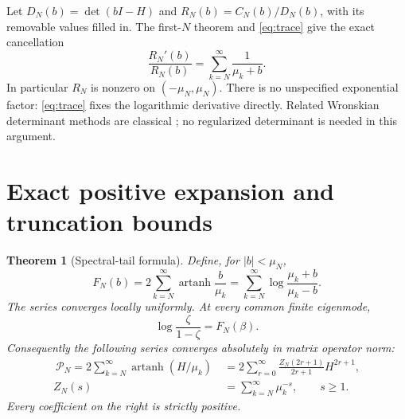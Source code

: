 \documentclass[10pt]{article}
\newtheorem{theorem}{Theorem}
\newcommand{\artanh}{\operatorname{artanh}}
\begin{document}
Let $D_N(b)=\det(bI-H)$ and $R_N(b)=C_N(b)/D_N(b)$, with its
removable values filled in. The first-$N$ theorem and \eqref{eq:trace}
give the exact cancellation
\begin{equation}
\frac{R_N'(b)}{R_N(b)}
=\sum_{k=N}^{\infty}\frac1{\mu_k+b}.
\label{eq:deftrace}
\end{equation}
In particular $R_N$ is nonzero on $(-\mu_N,\mu_N)$.
There is no unspecified exponential factor: \eqref{eq:trace} fixes
the logarithmic derivative directly. Related Wronskian determinant
methods are classical \cite{lesch}; no regularized determinant is needed
in this argument.

\section{Exact positive expansion and truncation bounds}
\begin{theorem}[Spectral-tail formula]
Define, for $|b|<\mu_N$,
\begin{equation}
F_N(b)=2\sum_{k=N}^\infty\artanh\frac b{\mu_k}
=\sum_{k=N}^\infty\log\frac{\mu_k+b}{\mu_k-b}.
\label{eq:F}
\end{equation}
The series converges locally uniformly. At every common finite eigenmode,
\begin{equation}
\log\frac{\zeta}{1-\zeta}=F_N(\beta).
\label{eq:exact}
\end{equation}
Consequently the following series converges absolutely in matrix
operator norm:
\begin{align}
\boxed{\ \mathcal P_N=2\sum_{k=N}^\infty
                  \artanh(H/\mu_k)\ }
&=2\sum_{r=0}^\infty
\frac{Z_N(2r+1)}{2r+1}H^{2r+1}, \label{eq:operator}\\
Z_N(s)&=\sum_{k=N}^\infty\mu_k^{-s},\qquad s\ge1.
\nonumber
\end{align}
Every coefficient on the right is strictly positive.
\end{theorem}
\end{document}
